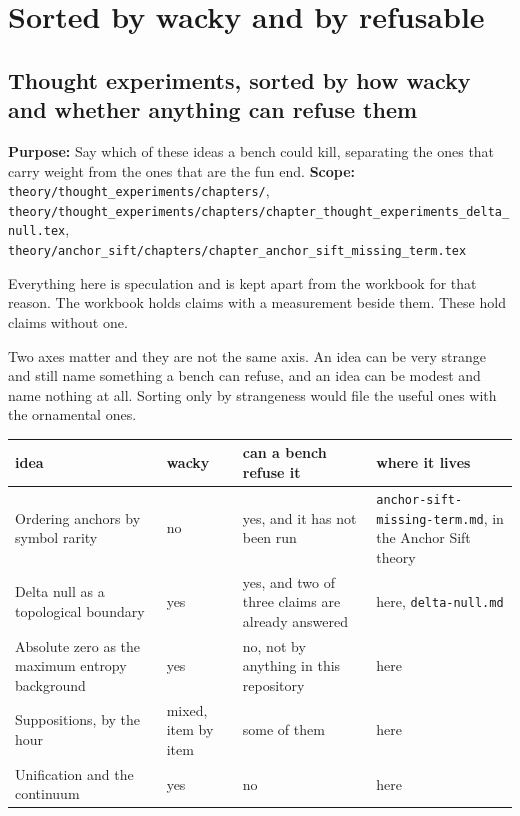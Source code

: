 \chapter{Sorted by wacky and by refusable}

\section{Thought experiments, sorted by how wacky and whether anything can refuse them}

\textbf{Purpose:} Say which of these ideas a bench could kill, separating the ones that carry weight from the ones that are the fun end. \textbf{Scope:} \texttt{theory/\allowbreak{}thought\_\allowbreak{}experiments/\allowbreak{}chapters/\allowbreak{}}, \texttt{theory/\allowbreak{}thought\_\allowbreak{}experiments/\allowbreak{}chapters/\allowbreak{}chapter\_\allowbreak{}thought\_\allowbreak{}experiments\_\allowbreak{}delta\_\allowbreak{}null.\allowbreak{}tex}, \texttt{theory/\allowbreak{}anchor\_\allowbreak{}sift/\allowbreak{}chapters/\allowbreak{}chapter\_\allowbreak{}anchor\_\allowbreak{}sift\_\allowbreak{}missing\_\allowbreak{}term.\allowbreak{}tex}

Everything here is speculation and is kept apart from the workbook for that reason. The workbook holds claims with a measurement beside them. These hold claims without one.

Two axes matter and they are not the same axis. An idea can be very strange and still name something a bench can refuse, and an idea can be modest and name nothing at all. Sorting only by strangeness would file the useful ones with the ornamental ones.

\tiny
\setlength{\tabcolsep}{2pt}
\begin{longtable}{@{}>{\raggedright\arraybackslash}p{}>{\raggedright\arraybackslash}p{}>{\raggedright\arraybackslash}p{}>{\raggedright\arraybackslash}p{}@{}}
\toprule
idea & wacky & can a bench refuse it & where it lives \\
\midrule
Ordering anchors by symbol rarity & no & yes, and it has not been run & \texttt{anchor-\allowbreak{}sift-\allowbreak{}missing-\allowbreak{}term.\allowbreak{}md}, in the Anchor Sift theory \\
Delta null as a topological boundary & yes & yes, and two of three claims are already answered & here, \texttt{delta-\allowbreak{}null.\allowbreak{}md} \\
Absolute zero as the maximum entropy background & yes & no, not by anything in this repository & here \\
Suppositions, by the hour & mixed, item by item & some of them & here \\
Unification and the continuum & yes & no & here \\
\bottomrule
\end{longtable}
\normalsize

